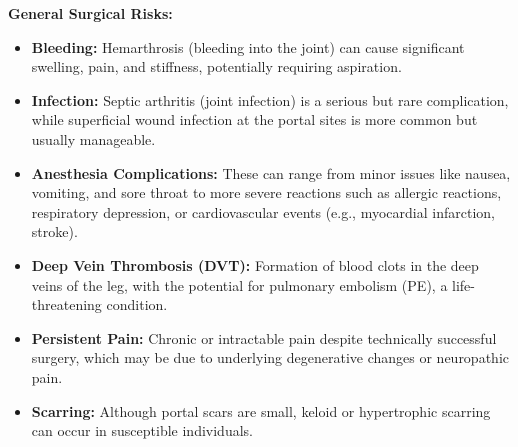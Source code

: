 \textbf{General Surgical Risks:}
\begin{itemize}
  \item \textbf{Bleeding:} Hemarthrosis (bleeding into the joint) can cause significant swelling, pain, and stiffness, potentially requiring aspiration.
  \item \textbf{Infection:} Septic arthritis (joint infection) is a serious but rare complication, while superficial wound infection at the portal sites is more common but usually manageable.
  \item \textbf{Anesthesia Complications:} These can range from minor issues like nausea, vomiting, and sore throat to more severe reactions such as allergic reactions, respiratory depression, or cardiovascular events (e.g., myocardial infarction, stroke).
  \item \textbf{Deep Vein Thrombosis (DVT):} Formation of blood clots in the deep veins of the leg, with the potential for pulmonary embolism (PE), a life-threatening condition.
  \item \textbf{Persistent Pain:} Chronic or intractable pain despite technically successful surgery, which may be due to underlying degenerative changes or neuropathic pain.
  \item \textbf{Scarring:} Although portal scars are small, keloid or hypertrophic scarring can occur in susceptible individuals.
\end{itemize}

